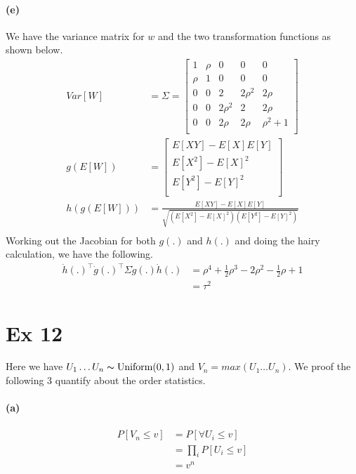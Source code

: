 \documentclass[11pt, letterpaper]{article}
\begin{document}
\paragraph{(e)}
We have the variance matrix for $w$ and the two transformation functions as shown below.
\begin{align*}
    Var[W] &= \Sigma =
      \begin{bmatrix}
        1 & \rho & 0 & 0 & 0 \\
        \rho & 1 & 0 & 0 & 0 \\
        0 & 0 & 2 & 2\rho^2 & 2\rho \\
        0 & 0 & 2\rho^2 & 2 & 2\rho \\
        0 & 0 & 2\rho & 2\rho & \rho^2+1 \\
      \end{bmatrix} \\
    g(E[W]) &=
      \begin{bmatrix}
        E[XY] - E[X]E[Y] \\
        E[X^2] - E[X]^2 \\
        E[Y^2] - E[Y]^2 \\
      \end{bmatrix} \\
    h(g(E[W])) &= \frac{E[XY] - E[X]E[Y]}{\sqrt{(E[X^2]-E[X]^2)(E[Y^2]-E[Y]^2)}} \\
\end{align*}
Working out the Jacobian for both $g(.)$ and $h(.)$ and doing the hairy calculation, we have the following.
\begin{align*}
    \Dot{h}(.)^{\intercal}\Dot{g}(.)^{\intercal} \Sigma \Dot{g}(.)\Dot{h}(.)
        &= \rho^4 + \frac{1}{2}\rho^3 -2\rho^2 - \frac{1}{2}\rho + 1 \\
        &= \tau^2 
\end{align*}

\newpage
\section{Ex 12}
Here we have $U_1 \dots U_n \thicksim \text{Uniform}(0, 1)$ and $V_n = max(U_1 \dots U_n)$. We proof the following 3 quantify about the order statistics.
\paragraph{(a)}
\begin{align*}
    P[V_n \leq v] &= P[\forall U_i \leq v] \\
        &= \prod_i P[U_i \leq v] \\
        &= v^n
\end{align*}
\end{document}
